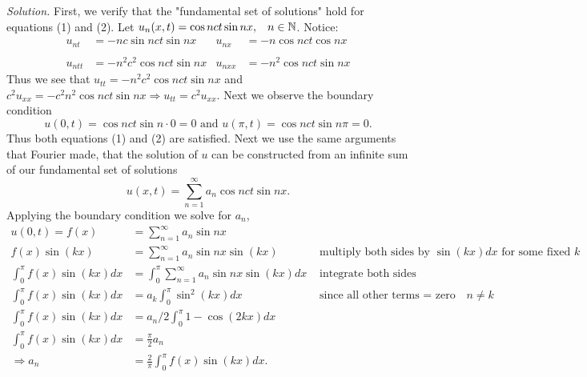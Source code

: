 \documentclass{article}
\begin{document}
\vspace{3mm}
\textit{Solution.} First, we verify that the "fundamental set of solutions" hold for equations (1) and (2). Let \(u_n(x,t)  
= \cos nct \sin nx,  \hspace{3mm} n\in\mathbb{N} \). Notice:
\begin{align*}
u_{nt}&= -nc \sin nct \sin nx  &   u_{nx}&=  -n \cos nct \cos nx \\
 &  	       &       &   \\
  u_{ntt}&= -n^2c^2 \cos nct \sin nx 	       &      u_{nxx} &=  -n^2 \cos nct \sin nx 
\end{align*}
Thus we see that \(u_{tt}= -n^2c^2 \cos nct \sin nx \) and \(c^2 u_{xx} =  -c^2n^2 \cos nct \sin nx \Rightarrow u_{tt}=c^2u_{xx}\). Next we observe the boundary condition
\[u(0,t) = \cos nct \sin n\cdot 0 = 0 \text{  and  } u(\pi,t) = \cos nct \sin n \pi = 0 . 
\]
Thus both equations (1) and (2) are satisfied. Next we use the same arguments that Fourier made, that the solution of \(u\) can be constructed from an infinite sum of our fundamental set of solutions
\[ u(x,t) = \sum_{n=1}^{\infty}  a_n \cos nct \sin nx. 
\]
Applying the boundary condition we solve for  \(a_n\),
\begin{align*}
u(0,t) = f(x) &= \sum_{n=1}^{\infty}  a_n  \sin nx \\
f(x) \sin(kx) &= \sum_{n=1}^{\infty}  a_n  \sin nx \sin(kx)  & \text{ multiply both sides by } \sin(kx) dx\text{ for some fixed }k \\
\int_0^\pi f(x) \sin(kx) dx &= \int_0^\pi \sum_{n=1}^{\infty}  a_n  \sin nx \sin(kx)  dx& \text{ integrate both sides}\\
\int_0^\pi f(x) \sin(kx) dx &= a_k \int_0^\pi \sin^2(kx) dx& \text{ since all other terms = zero when \(n\neq k\)}\\
\int_0^\pi f(x) \sin(kx) dx &= a_n/2 \int_0^\pi 1-\cos (2kx )dx \\
\int_0^\pi f(x) \sin(kx) dx &= \frac{\pi}{2} a_n \\
\Rightarrow a_n &= \frac{2}{\pi}\int_0^\pi f(x) \sin(kx) dx.
\end{align*}
\end{document}
